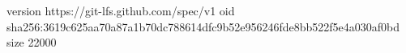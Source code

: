 version https://git-lfs.github.com/spec/v1
oid sha256:3619c625aa70a87a1b70dc788614dfc9b52e956246fde8bb522f5e4a030af0bd
size 22000
